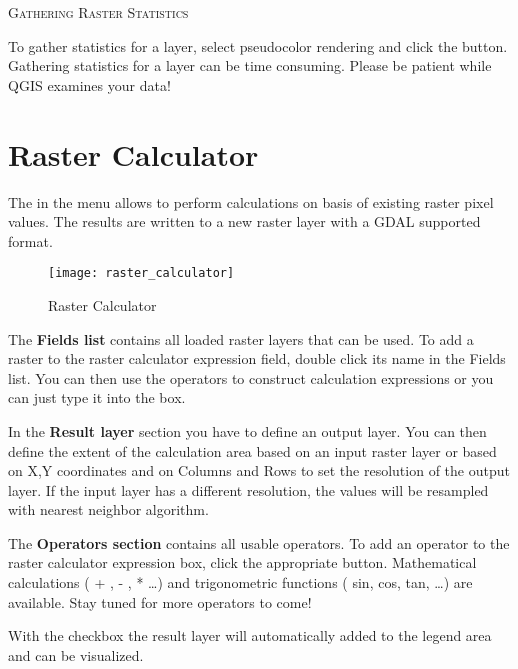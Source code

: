\begin{Tip}\caption{\textsc{Gathering Raster Statistics}}
To gather statistics for a layer, select pseudocolor rendering and
click the  button. Gathering statistics for a layer can be time
consuming. Please be patient while QGIS examines your
data!
\end{Tip}

\section{Raster Calculator}\label{sec:raster_calc}

The  in the  menu allows to 
perform calculations on basis of existing raster pixel values. The results 
are written to a new raster layer with a GDAL supported format. 

\begin{figure}[ht]
  \centering
    \texttt{[image: raster\_calculator]}
    \caption{Raster Calculator \nixcaption}\label{fig:raster_calculator}
\end{figure}

The \textbf{Fields list} contains all loaded raster layers that can be used. 
To add a raster to the raster calculator expression field, double
click its name in the Fields list. You can then use the operators to construct 
calculation expressions or you can just type it into the box.

In the \textbf{Result layer} section you have to define an output layer. You can 
then define the extent of the calculation area based on an input raster layer or 
based on X,Y coordinates and on Columns and Rows to set the resolution of the 
output layer. If the input layer has a different resolution, the values will be 
resampled with nearest neighbor algorithm.  

The \textbf{Operators section} contains all usable operators. To add an operator
to the raster calculator expression box, click the appropriate button. Mathematical
calculations ( + , - , * \dots) and trigonometric functions ( sin, cos, tan, \dots) 
are available. Stay tuned for more operators to come!

With the  checkbox the result layer will automatically 
added to the legend area and can be visualized. 

\FloatBarrier
